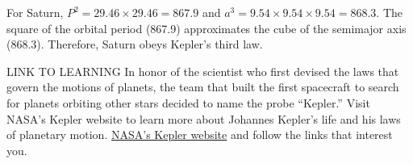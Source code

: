 \documentclass[main-astronomy.tex]{subfiles}
\begin{document}
\Solution For Saturn, $P^2 = 29.46 \times 29.46 = 867.9$ and $a^3 = 9.54 \times 9.54 \times 9.54 = 868.3$. The square of the orbital period (867.9) approximates the cube of the semimajor axis (868.3). Therefore, Saturn obeys Kepler's third law.

\endsolution

\begin{gradient}{LINK TO LEARNING}
    In honor of the scientist who first devised the laws that govern the motions of planets, the team that built the first spacecraft to search for planets orbiting other stars decided to name the probe ``Kepler.'' Visit NASA's Kepler website to learn more about Johannes Kepler's life and his laws of planetary motion. \href{https://openstax.org/l/30nasakepmiss}{NASA's Kepler website} and follow the links that interest you.
\end{gradient}
\end{document}
